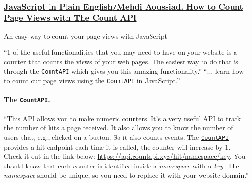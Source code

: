 \documentclass{article}
\numberwithin{equation}{section}
\begin{document}
\subsubsection{\href{https://javascript.plainenglish.io/how-to-count-page-views-with-the-count-api-afc9369c1f8f}{JavaScript in Plain English\texttt{/}Mehdi Aoussiad. How to Count Page Views with The Count API}}

\begin{flushright}
	An easy way to count your page views with JavaScript.
\end{flushright}
``1 of the useful functionalities that you may need to have on your website is a counter that counts the views of your web pages. The easiest way to do that is through the \texttt{CountAPI} which gives you this amazing functionality.'' ``$\ldots$ learn how to count our page views using the \texttt{CountAPI} in JavaScript.''

\paragraph{The \texttt{CountAPI}.} ``This API allows you to make numeric counters. It's a very useful API to track the number of hits a page received. It also allows you to know the number of users that, e.g., clicked on a button. So it also counts events. The \href{https://countapi.xyz/}{\texttt{CountAPI}} provides a hit endpoint each time it is called, the counter will increase by 1. Check it out in the link below: \url{https://api.countapi.xyz/hit/namespace/key}. You should know that each counter is identified inside a \textit{namespace} with a \textit{key}. The \textit{namespace} should be unique, so you need to replace it with your website domain.''
\end{document}

